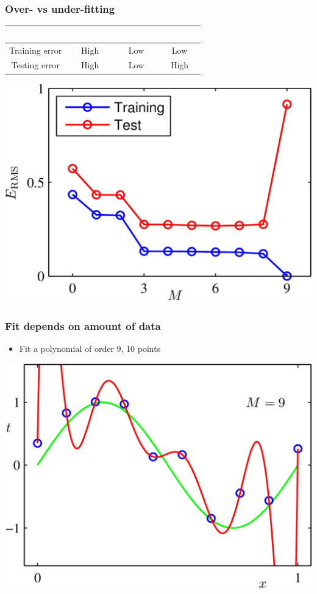 \documentclass[12pt,notes,mathserif]{beamer}
\begin{document}
\begin{frame}[c]
	\frametitle{Over- vs under-fitting}

	\begin{center}
		\begin{tabular}{|c|c|c|c|}
			\rowcolor{.!30!gray}
			               & \textcolor{white}{Under-fit} & \textcolor{white}{Good fit} & \textcolor{white}{Over-fit} \\\hline
			Training error & High                         & Low                         & Low                         \\\hline
			Testing error  & High                         & Low                         & High                        \\\hline
		\end{tabular}%
	\end{center}
	\begin{center}
		\includegraphics[width=0.61\linewidth]{fig/lec59.jpg}
	\end{center}
\end{frame}

\begin{frame}[c]
	\frametitle{Fit depends on amount of data}
	\begin{itemize}
		\item  Fit a polynomial of order 9, 10 points
	\end{itemize}
	\begin{center}
		\includegraphics[width=0.61\linewidth]{fig/lec510.jpg}
	\end{center}
\end{frame}
\end{document}
